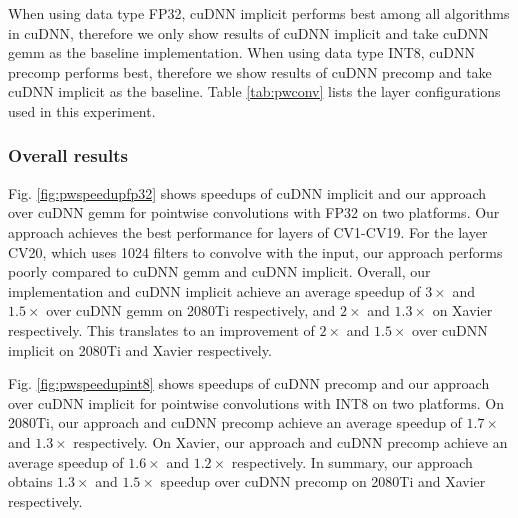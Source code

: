 When using data type FP32, cuDNN implicit performs best among all algorithms in cuDNN, therefore we only show results of cuDNN implicit and take cuDNN gemm as the baseline implementation.
When using data type INT8, cuDNN precomp performs best, therefore we show results of cuDNN precomp and take cuDNN implicit as the baseline.
Table \ref{tab:pwconv} lists the layer configurations used in this experiment.

\subsubsection{Overall results} Fig. \ref{fig:pwspeedupfp32} shows speedups of cuDNN implicit and our approach over cuDNN gemm for pointwise convolutions with FP32 on two platforms.
Our approach achieves the best performance for layers of CV1-CV19.
For the layer CV20, which uses 1024 filters to convolve with the input, our approach performs poorly compared to cuDNN gemm and cuDNN implicit.
Overall, our implementation and cuDNN implicit achieve an average speedup of $3\times$ and $1.5\times$ over cuDNN gemm on 2080Ti respectively, and $2\times$ and $1.3\times$ on Xavier respectively.
This translates to an improvement of $2\times$ and $1.5\times$ over cuDNN implicit on 2080Ti and Xavier respectively.

Fig. \ref{fig:pwspeedupint8} shows speedups of cuDNN precomp and our approach over cuDNN implicit for pointwise convolutions with INT8 on two platforms.
On 2080Ti, our approach and cuDNN precomp achieve an average speedup of $1.7\times$ and $1.3\times$ respectively.
On Xavier, our approach and cuDNN precomp achieve an average speedup of $1.6\times$ and $1.2\times$ respectively.
In summary, our approach obtains $1.3\times$ and $1.5\times$ speedup over cuDNN precomp on 2080Ti and Xavier respectively.


